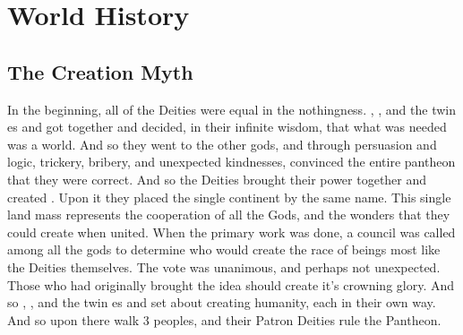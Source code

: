 \documentclass[blue]{GL2020}
\begin{document}
\name{\bWorld{}}

\section*{World History}

\subsection*{The Creation Myth}
In the beginning, all of the Deities were equal in the nothingness. \cFarmGod{}, \cTechGod{}, and the twin \cEbb{\God}es \cEbb{} and \cFlow{} got together and decided, in their infinite wisdom, that what was needed was a world. And so they went to the other gods, and through persuasion and logic, trickery, bribery, and unexpected kindnesses, convinced the entire pantheon that they were correct. And so the Deities brought their power together and created \pEarth{}. Upon it they placed the single continent by the same name. This single land mass represents the cooperation of all the Gods, and the wonders that they could create when united. When the primary work was done, a council was called among all the gods to determine who would create the race of beings most like the Deities themselves. The vote was unanimous, and perhaps not unexpected. Those who had originally brought the idea should create it's crowning glory. And so \cFarmGod{}, \cTechGod{}, and the twin \cEbb{\God}es \cEbb{} and \cFlow{} set about creating humanity, each in their own way. And so upon \pEarth{} there walk 3 peoples, and their Patron Deities rule the Pantheon.

\end{document}
